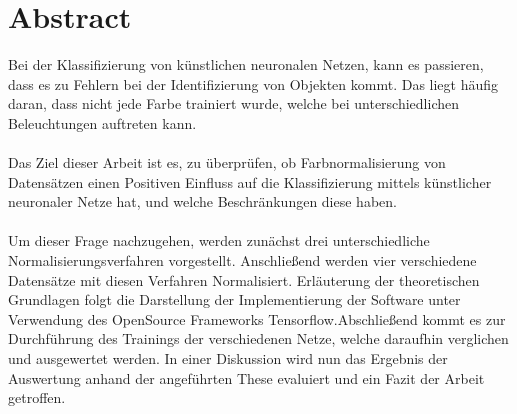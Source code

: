 \chapter*{Abstract}
Bei der Klassifizierung von künstlichen neuronalen Netzen, kann es passieren, dass es zu Fehlern bei der Identifizierung von Objekten kommt. Das liegt häufig daran, dass nicht jede Farbe trainiert wurde, welche bei unterschiedlichen Beleuchtungen auftreten kann. \\\\
Das Ziel dieser Arbeit ist es, zu überprüfen, ob Farbnormalisierung von Datensätzen einen Positiven Einfluss auf die Klassifizierung mittels künstlicher neuronaler Netze hat, und welche Beschränkungen diese haben.\\\\
Um dieser Frage nachzugehen, werden zunächst drei unterschiedliche Normalisierungsverfahren vorgestellt. Anschließend werden vier verschiedene Datensätze mit diesen Verfahren Normalisiert. Erläuterung der theoretischen Grundlagen folgt die Darstellung der Implementierung der Software unter Verwendung des OpenSource Frameworks Tensorflow.Abschließend kommt es zur Durchführung des Trainings der verschiedenen Netze, welche daraufhin verglichen und ausgewertet werden. In einer Diskussion wird nun das Ergebnis der Auswertung anhand der angeführten These evaluiert und ein Fazit der Arbeit getroﬀen.
